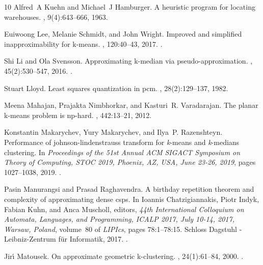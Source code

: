 \begin{thebibliography}{10}
Alfred~A Kuehn and Michael~J Hamburger.
\newblock A heuristic program for locating warehouses.
, 9(4):643--666, 1963.

Euiwoong Lee, Melanie Schmidt, and John Wright.
\newblock Improved and simplified inapproximability for k-means.
, 120:40--43, 2017.
\newblock \href {https://doi.org/10.1016/j.ipl.2016.11.009}
  {}.

Shi Li and Ola Svensson.
\newblock Approximating k-median via pseudo-approximation.
, 45(2):530--547, 2016.
\newblock \href {https://doi.org/10.1137/130938645}
  {}.

Stuart Lloyd.
\newblock Least squares quantization in pcm.
, 28(2):129--137, 1982.

Meena Mahajan, Prajakta Nimbhorkar, and Kasturi~R. Varadarajan.
\newblock The planar k-means problem is np-hard.
, 442:13--21, 2012.

Konstantin Makarychev, Yury Makarychev, and Ilya~P. Razenshteyn.
\newblock Performance of johnson-lindenstrauss transform for \emph{k}-means and
  \emph{k}-medians clustering.
\newblock In {\em Proceedings of the 51st Annual {ACM} {SIGACT} Symposium on
  Theory of Computing, {STOC} 2019, Phoenix, AZ, USA, June 23-26, 2019}, pages
  1027--1038, 2019.
\newblock \href {https://doi.org/10.1145/3313276.3316350}
  {}.

Pasin Manurangsi and Prasad Raghavendra.
\newblock A birthday repetition theorem and complexity of approximating dense
  csps.
\newblock In Ioannis Chatzigiannakis, Piotr Indyk, Fabian Kuhn, and Anca
  Muscholl, editors, {\em 44th International Colloquium on Automata, Languages,
  and Programming, {ICALP} 2017, July 10-14, 2017, Warsaw, Poland}, volume~80
  of {\em LIPIcs}, pages 78:1--78:15. Schloss Dagstuhl - Leibniz-Zentrum
  f{\"{u}}r Informatik, 2017.
\newblock \href {https://doi.org/10.4230/LIPIcs.ICALP.2017.78}
  {}.

Jir{\'{\i}} Matousek.
\newblock On approximate geometric k-clustering.
, 24(1):61--84, 2000.
\newblock \href {https://doi.org/10.1007/s004540010019}
  {}.


\end{thebibliography}
